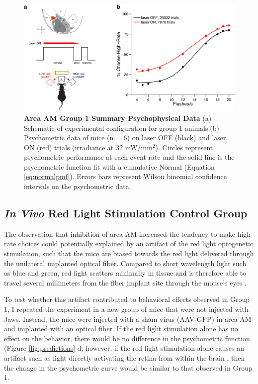 \begin{figure}
  \centering
   \includegraphics[width=\textwidth]{Figures/chapter4/jaws_AM_group1_summaryPMF.png}
  \caption[Area AM Group 1 Summary Psychophysical Data]{\textbf{Area AM Group 1 Summary Psychophysical Data} (a) Schematic of experimental configuration for group 1 animals.(b) Psychometric data of mice (n = 6) on laser OFF (black) and laser ON (red) trials (irradiance at 32 mW/mm$^{2}$). Circles represent psychometric performance at each event rate and the solid line is the psychometric function fit with a cumulative Normal (Equation \ref{eq:normalpmf}). Errors bars represent Wilson binomial confidence intervals on the psychometric data.}
   \label{fig:AMgroup1summary}
\end{figure}

\subsection{\emph{In Vivo} Red Light Stimulation Control Group}
The observation that inhibition of area AM increased the tendency to make high-rate choices could potentially explained by an artifact of the red light optogenetic stimulation, such that the mice are biased towards the red light delivered through the unilateral implanted optical fiber. Compared to short wavelength light such as blue and green, red light scatters minimally in tissue and is therefore able to travel several millimeters from the fiber implant site through the mouse's eyes \parencite{Danskin2015}.\par

To test whether this artifact contributed to behavioral effects observed in Group 1, I repeated the experiment in a new group of mice that were not injected with Jaws. Instead, the mice were injected with a sham virus (AAV-GFP) in area AM and implanted with an optical fiber. If the red light stimulation alone has no effect on the behavior, there would be no difference in the psychometric function (Figure \ref{fig:predictions} d; however, if the red light stimulation alone causes an artifact such as light directly activating the retina from within the brain \parencite{Danskin2015}, then the change in the psychometric curve would be similar to that observed in Group 1. \par


